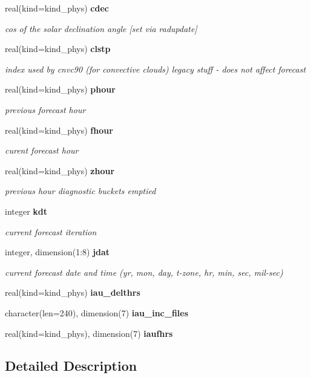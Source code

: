 \begin{DoxyCompactItemize}
real(kind=kind\+\_\+phys) \textbf{ cdec}
\begin{DoxyCompactList}\small\item\em cos of the solar declination angle [set via radupdate] \end{DoxyCompactList}\item 
real(kind=kind\+\_\+phys) \textbf{ clstp}
\begin{DoxyCompactList}\small\item\em index used by cnvc90 (for convective clouds) legacy stuff -\/ does not affect forecast \end{DoxyCompactList}\item 
real(kind=kind\+\_\+phys) \textbf{ phour}
\begin{DoxyCompactList}\small\item\em previous forecast hour \end{DoxyCompactList}\item 
real(kind=kind\+\_\+phys) \textbf{ fhour}
\begin{DoxyCompactList}\small\item\em curent forecast hour \end{DoxyCompactList}\item 
real(kind=kind\+\_\+phys) \textbf{ zhour}
\begin{DoxyCompactList}\small\item\em previous hour diagnostic buckets emptied \end{DoxyCompactList}\item 
integer \textbf{ kdt}
\begin{DoxyCompactList}\small\item\em current forecast iteration \end{DoxyCompactList}\item 
integer, dimension(1\+:8) \textbf{ jdat}
\begin{DoxyCompactList}\small\item\em current forecast date and time (yr, mon, day, t-\/zone, hr, min, sec, mil-\/sec) \end{DoxyCompactList}\item 
real(kind=kind\+\_\+phys) \textbf{ iau\+\_\+delthrs}
\item 
character(len=240), dimension(7) \textbf{ iau\+\_\+inc\+\_\+files}
\item 
real(kind=kind\+\_\+phys), dimension(7) \textbf{ iaufhrs}
\end{DoxyCompactItemize}


\subsection{Detailed Description}


